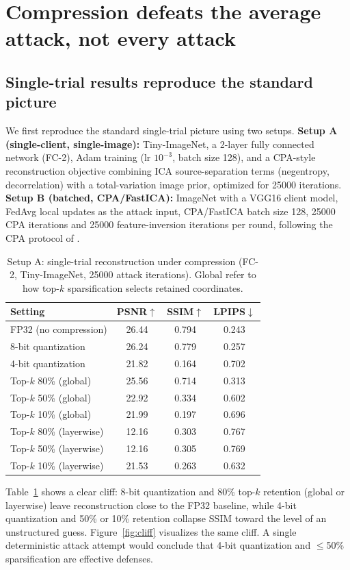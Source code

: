\documentclass{article}
\begin{document}
\section{Compression defeats the average attack, not every attack}
\subsection{Single-trial results reproduce the standard picture}
We first reproduce the standard single-trial picture using two setups.
\textbf{Setup A (single-client, single-image):} Tiny-ImageNet, a 2-layer
fully connected network (FC-2), Adam training (lr $10^{-3}$, batch size 128),
and a CPA-style reconstruction objective combining ICA source-separation
terms (negentropy, decorrelation) with a total-variation image prior,
optimized for 25000 iterations. \textbf{Setup B (batched, CPA/FastICA):}
ImageNet with a VGG16 client model, FedAvg local updates as the attack
input, CPA/FastICA batch size 128, 25000 CPA iterations and 25000 feature-inversion
iterations per round, following the CPA protocol of \cite{kariyappa2023cocktail}.

\begin{table}[t]
\caption{Setup A: single-trial reconstruction under compression (FC-2,
Tiny-ImageNet, 25000 attack iterations). Global refer to how
top-$k$ sparsification selects retained coordinates.}
\label{tab:fc2}
\centering
\small
\begin{tabular}{lccc}
\toprule
Setting & PSNR$\uparrow$ & SSIM$\uparrow$ & LPIPS$\downarrow$\\
\midrule
FP32 (no compression) & 26.44 & 0.794 & 0.243\\
8-bit quantization & 26.24 & 0.779 & 0.257\\
4-bit quantization & 21.82 & 0.164 & 0.702\\
Top-$k$ 80\% (global) & 25.56 & 0.714 & 0.313\\
Top-$k$ 50\% (global) & 22.92 & 0.334 & 0.602\\
Top-$k$ 10\% (global) & 21.99 & 0.197 & 0.696\\
Top-$k$ 80\% (layerwise) & 12.16 & 0.303 & 0.767\\
Top-$k$ 50\% (layerwise) & 12.16 & 0.305 & 0.769\\
Top-$k$ 10\% (layerwise) & 21.53 & 0.263 & 0.632\\
\bottomrule
\end{tabular}
\end{table}

Table~\ref{tab:fc2} shows a clear cliff: 8-bit quantization and 80\% top-$k$
retention (global or layerwise) leave reconstruction close to the FP32
baseline, while 4-bit quantization and 50\% or 10\% retention collapse SSIM
toward the level of an unstructured guess. Figure~\ref{fig:cliff} visualizes
the same cliff. A single deterministic attack attempt would conclude that
4-bit quantization and $\le$50\% sparsification are effective defenses.
\end{document}
